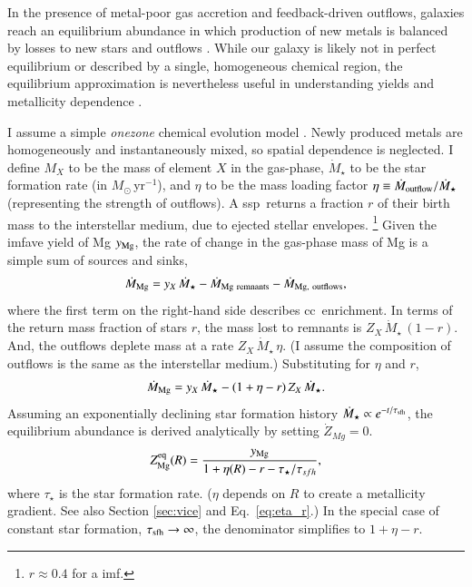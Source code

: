 \documentclass[12pt,oneside,letterpaper]{report}
\newcommand{\cc}{\gls{cc}}
\newcommand{\ssp}{\gls{ssp}}
\newcommand{\imf}{\gls{imf}}
\begin{document}
In the presence of metal-poor gas accretion and feedback-driven outflows, galaxies reach an equilibrium abundance in which production of new metals is balanced by losses to new stars and outflows \citep{larson72, dalcanton07, FD08, PS11, lilly13}.
While our galaxy is likely not in perfect equilibrium or described by a single, homogeneous chemical region, the equilibrium approximation is nevertheless useful in understanding yields and metallicity dependence \citep[e.g.][]{james_dwarf,james+23,WAF17}. 

I assume a simple \textit{\gls{onezone}} chemical evolution model \cite[e.g.][]{tinsley80, pagel09, matteucci21}.  Newly produced metals are homogeneously and instantaneously mixed, so spatial dependence is neglected.
I define $M_{X}$ to be the mass of element $X$ in the gas-phase, $\dot{M}_\star$ to be the star formation rate (in $M_\odot\,$yr$^{-1}$), and $\eta$ to be the mass loading factor $\eta\equiv\dot{M}_{\rm outflow}/\dot{M}_\star$ (representing the strength of outflows). A \ssp\ returns a fraction $r$ of their birth mass to the interstellar medium, due to ejected stellar envelopes.%
\footnote{$r\approx0.4$ for a \citealt{kroupa01} \imf.}
Given the \gls{imfave} yield of Mg $y_{\rm Mg}$, the rate of change in the gas-phase mass of Mg is a simple sum of sources and sinks,
\begin{equation}
    \dot{M}_{\rm Mg} =  y_{X}\,\dot{M}_\star - \dot{M}_{\rm Mg~remnants} - \dot{M}_{\rm Mg,~outflows},
\end{equation}
where the first term on the right-hand side describes \cc\ enrichment. 
In terms of the return mass fraction of stars $r$, the mass lost to remnants is $Z_X\,\dot{M}_\star\,(1-r)$.  And, the outflows deplete mass at a rate $Z_X \,\dot{M}_\star\,\eta$. (I assume the composition of outflows is the same as the interstellar medium.) Substituting for $\eta$ and $r$,  
\begin{equation}
    \dot{M}_{\rm Mg}= y_{X}\,\dot{M}_\star - (1 + \eta - r)\,Z_{X}\,\dot{M}_\star.
\end{equation}
Assuming an exponentially declining star formation history $\dot{M}_\star \propto e^{-t/\tau_{\rm sfh}}$, the equilibrium abundance is derived analytically by setting $\dot{Z}_{Mg}=0$.
\begin{equation}\label{eq:z_eq}
    Z_{\rm Mg}^{\rm eq}(R) = \frac{y_{\rm Mg}}{1 + \eta(R) - r - \tau_\star / \tau_{sfh}},
\end{equation}
where $\tau_{\star}$ is the star formation rate. ($\eta$ depends on $R$ to create a metallicity gradient. See also Section \ref{sec:vice} and Eq.~\ref{eq:eta_r}.)
In the special case of constant star formation, $\tau_{\rm sfh}\to\infty$, the denominator simplifies to $1+\eta-r$.
\end{document}

